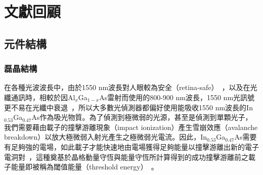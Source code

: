 \chapter{文獻回顧}
\label{c:related}
\section{元件結構}
\subsection{磊晶結構}
在各種光波波長中，由於1550 nm波長對人眼較為安全（retina-safe）~\cite{saito2004experimental}\cite{hey2014novel}，以及在光纖通訊時，相較於因Al$_x$Ga$_{1-x}$As雷射而使用的800-900 nm波長，1550 nm光訊號更不易在光纖中衰退~\cite{campbell2016recent}，所以大多數光偵測器都偏好使用能吸收1550 nm波長的In$_{0.53}$Ga$_{0.47}$As作為吸光物質。為了偵測到極微弱的光源，甚至是偵測到單顆光子，我們需要藉由載子的撞擊游離現象（impact ionization）產生雪崩效應（avalanche breakdown）以放大極微弱入射光產生之極微弱光電流。因此，In$_{0.53}$Ga$_{0.47}$As需要有足夠強的電場，如此載子才能快速地由電場獲得足夠能量以撞擊游離出新的電子電洞對~\cite{capasso1985physics}，這種奠基於晶格動量守恆與能量守恆所計算得到的成功撞擊游離前之載子能量即被稱為閾值能量（threshold energy）~\cite{capasso1985physics}\cite{anderson1972threshold}。

